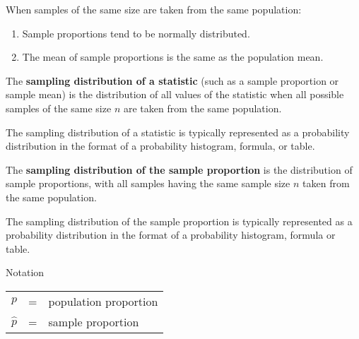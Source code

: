 \documentclass{beamer}
\begin{document}
\begin{frame}
\begin{note}
When samples of the same size are taken from the same population:
\begin{enumerate}
\item Sample proportions tend to be normally distributed.
\item The mean of sample proportions is the same as the population mean.
\end{enumerate}
\end{note}\pause

\begin{definition}
The \textbf{sampling distribution of a statistic} (such as a sample proportion or sample mean) is the distribution of all values of the statistic when all possible samples of the same size $n$ are taken from the same population.
\end{definition}\pause

\begin{note}
The sampling distribution of a statistic is typically represented as a probability distribution in the format of a probability histogram, formula, or table.
\end{note}
\end{frame}

\begin{frame}
\begin{definition}
The \textbf{sampling distribution of the sample proportion} is the distribution of sample proportions, with all samples having the same sample size $n$ taken from the same population.
\end{definition}\pause

\begin{note}
The sampling distribution of the sample proportion is typically represented as a probability distribution in the format of a probability histogram, formula or table.
\end{note}\pause

\begin{block}{Notation}
\begin{center}
\begin{tabular}{rcl}
$p$ & = & population proportion \\
$\hat{p}$ & = & sample proportion
\end{tabular}
\end{center}
\end{block}
\end{frame}
\end{document}
